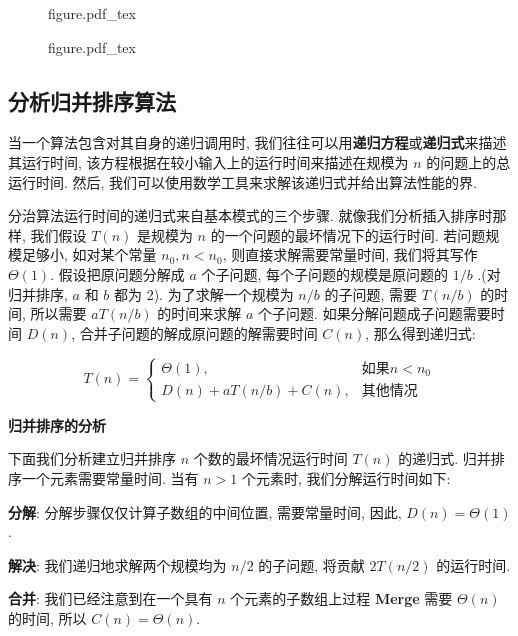 \documentclass[oneside,10pt,fontset=none]{ctexbook}
\numberwithin{definition}{chapter}
\numberwithin{theorem}{chapter}
\numberwithin{lemma}{chapter}
\begin{document}
\begin{figure}[htbp]
    \def\svgwidth{\columnwidth}
    {figure.pdf_tex}
    \label{fig:归并排序中的归并过程示意图}
\end{figure}

\begin{figure}[htbp]
    \def\svgwidth{\columnwidth}
    {figure.pdf_tex}
    \label{fig:归并排序完整过程示意图}
\end{figure}

\subsection{分析归并排序算法}

当一个算法包含对其自身的递归调用时, 我们往往可以用\textbf{递归方程}或\textbf{递归式}来描述其运行时间, 该方程根据在较小输入上的运行时间来描述在规模为 $n$ 的问题上的总运行时间. 然后, 我们可以使用数学工具来求解该递归式并给出算法性能的界.

分治算法运行时间的递归式来自基本模式的三个步骤. 就像我们分析插入排序时那样, 我们假设 $T(n)$ 是规模为 $n$ 的一个问题的最坏情况下的运行时间. 若问题规模足够小, 如对某个常量 $n_0, n<n_0$, 则直接求解需要常量时间, 我们将其写作$\Theta(1)$. 假设把原问题分解成 $a$ 个子问题, 每个子问题的规模是原问题的 $1/b$ .(对归并排序, $a$ 和 $b$ 都为 2). 为了求解一个规模为 $n/b$ 的子问题, 需要 $T(n/b)$ 的时间, 所以需要 $aT(n/b)$ 的时间来求解 $a$ 个子问题. 如果分解问题成子问题需要时间 $D(n)$, 合并子问题的解成原问题的解需要时间 $C(n)$, 那么得到递归式:

\begin{equation*}
    T(n) = \begin{cases}
        \Theta(1), &\text{如果} n < n_0 \\
        D(n) + aT(n/b) + C(n), &\text{其他情况}
    \end{cases}
\end{equation*}

\textbf{归并排序的分析}

下面我们分析建立归并排序 $n$ 个数的最坏情况运行时间 $T(n)$ 的递归式. 归并排序一个元素需要常量时间. 当有 $n>1$ 个元素时, 我们分解运行时间如下:

\textbf{分解}: 分解步骤仅仅计算子数组的中间位置, 需要常量时间, 因此, $D(n)=\Theta(1)$.

\textbf{解决}: 我们递归地求解两个规模均为 $n/2$ 的子问题, 将贡献 $2T(n/2)$ 的运行时间.

\textbf{合并}: 我们已经注意到在一个具有 $n$ 个元素的子数组上过程 \textbf{Merge} 需要 $\Theta(n)$ 的时间, 所以 $C(n)=\Theta(n)$.
\end{document}
